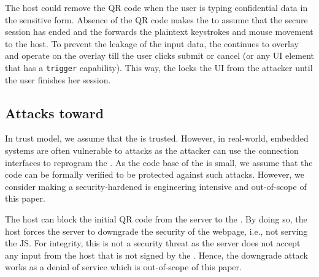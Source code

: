 \parasave
{} The host could remove the QR code when the user is typing confidential data in the sensitive form. Absence of the QR code makes the \device to assume that the secure session has ended and the \device forwards the plaintext keystrokes and mouse movement to the host. To prevent the leakage of the input data, the \device continues to overlay and operate on the overlay till the user clicks submit or cancel (or any UI element that has a \texttt{trigger}  capability). This way, the \device locks the UI from the attacker until the user finishes her session.

\subsection{Attacks toward \device} 
\label{sec:securityAnalysis:device}

In \name trust model, we assume that the \device is trusted. However, in real-world, embedded systems are often vulnerable to attacks as the attacker can use the connection interfaces to reprogram the \device. 
As the code base of the \device is small, we assume that the code can be formally verified to be protected against such attacks. However, we consider making a security-hardened \device is engineering intensive and out-of-scope of this paper. 

\parasave
{} The host can block the initial QR code from the server to the \device. By doing so, the host forces the server to downgrade the security of the webpage, i.e., not serving the \name JS. For integrity, this is not a security threat as the server does not accept any input from the host that is not signed by the \device. Hence, the downgrade attack works as a denial of service which is out-of-scope of this paper.

